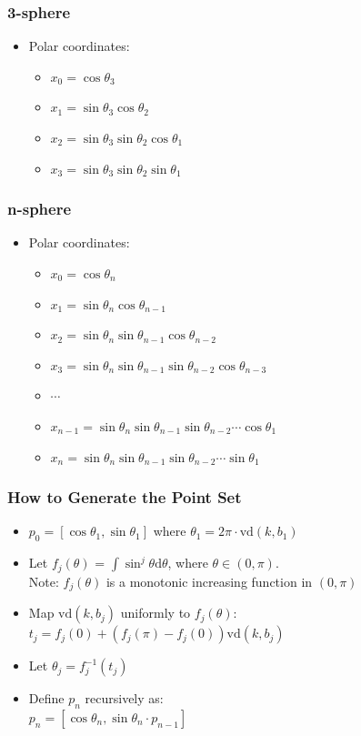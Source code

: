 \documentclass[serif]{beamer} %
\begin{document}
\begin{frame}
  \frametitle{3-sphere}
  \begin{itemize}
    \item Polar coordinates:
    \begin{itemize}
      \item $x_0 = \cos\theta_3$
      \item $x_1 = \sin\theta_3 \cos\theta_2$
      \item $x_2 = \sin\theta_3 \sin\theta_2 \cos\theta_1$
      \item $x_3 = \sin\theta_3 \sin\theta_2 \sin\theta_1$
    \end{itemize}
  \end{itemize}
\end{frame}

\begin{frame}
  \frametitle{n-sphere}
  \begin{itemize}
    \item Polar coordinates:
    \begin{itemize}
      \item $x_0 = \cos\theta_n$
      \item $x_1 = \sin\theta_n \cos\theta_{n-1}$
      \item $x_2 = \sin\theta_n \sin\theta_{n-1} \cos\theta_{n-2} $
      \item $x_3 = \sin\theta_n \sin\theta_{n-1} \sin\theta_{n-2} \cos\theta_{n-3} $
      \item $\cdots$
      \item $x_{n-1} = \sin\theta_n \sin\theta_{n-1} \sin\theta_{n-2} \cdots \cos\theta_1$
      \item $x_n = \sin\theta_n \sin\theta_{n-1} \sin\theta_{n-2} \cdots \sin\theta_1$
    \end{itemize}
  \end{itemize}
\end{frame}

\begin{frame}
  \frametitle{How to Generate the Point Set}
  \begin{itemize}
    \item $p_0 = [\cos\theta_1, \sin\theta_1]$ where $\theta_1 = 2\pi\cdot\mathrm{vd}(k,b_1)$
    \item Let $f_j(\theta)$ = $\int\sin^j\theta \mathrm{d}\theta$, where $\theta\in (0,\pi)$. \\
    Note: $f_j(\theta)$ is a monotonic increasing function in $(0,\pi) $
    \item Map $\mathrm{vd}(k,b_j)$ uniformly to $f_j(\theta)$:\\
     $t_j = f_j(0) + (f_j(\pi) - f_j(0)) \mathrm{vd}(k,b_j)$
    \item Let $\theta_j = f_j^{-1}(t_j)$
    \item Define $p_n$ recursively as: \\
          $p_n = [\cos\theta_n, \sin\theta_n \cdot p_{n-1}]$
  \end{itemize}
\end{frame}
\end{document}
